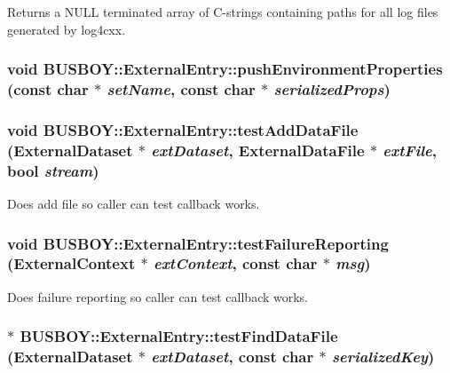 Returns a NULL terminated array of C-\/strings containing paths for all log files generated by log4cxx. \hypertarget{classBUSBOY_1_1ExternalEntry_a08262dbdeff6bce6cb0ad568d1a1a395}{
\subsubsection[{pushEnvironmentProperties}]{\setlength{\rightskip}{0pt plus 5cm}void BUSBOY::ExternalEntry::pushEnvironmentProperties (const char $\ast$ {\em setName}, \/  const char $\ast$ {\em serializedProps})}}
\label{classBUSBOY_1_1ExternalEntry_a08262dbdeff6bce6cb0ad568d1a1a395}
\hypertarget{classBUSBOY_1_1ExternalEntry_a735cdf7fcbc7d961254b99f59aa735ee}{
\subsubsection[{testAddDataFile}]{\setlength{\rightskip}{0pt plus 5cm}void BUSBOY::ExternalEntry::testAddDataFile ({\bf ExternalDataset} $\ast$ {\em extDataset}, \/  {\bf ExternalDataFile} $\ast$ {\em extFile}, \/  bool {\em stream})}}
\label{classBUSBOY_1_1ExternalEntry_a735cdf7fcbc7d961254b99f59aa735ee}


Does add file so caller can test callback works. \hypertarget{classBUSBOY_1_1ExternalEntry_aeea4e324953906fce5a265c56fe3edc2}{
\subsubsection[{testFailureReporting}]{\setlength{\rightskip}{0pt plus 5cm}void BUSBOY::ExternalEntry::testFailureReporting ({\bf ExternalContext} $\ast$ {\em extContext}, \/  const char $\ast$ {\em msg})}}
\label{classBUSBOY_1_1ExternalEntry_aeea4e324953906fce5a265c56fe3edc2}


Does failure reporting so caller can test callback works. \hypertarget{classBUSBOY_1_1ExternalEntry_a5a52813093215ab59a91d012255cbba6}{
\subsubsection[{testFindDataFile}]{ $\ast$ BUSBOY::ExternalEntry::testFindDataFile ({\bf ExternalDataset} $\ast$ {\em extDataset}, \/  const char $\ast$ {\em serializedKey})}}
\label{classBUSBOY_1_1ExternalEntry_a5a52813093215ab59a91d012255cbba6}



